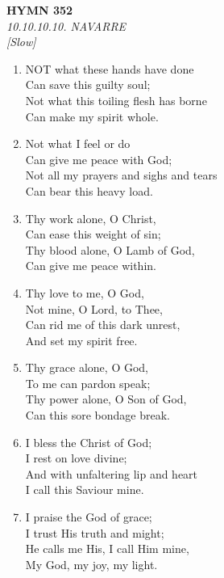 \newpage
\begin{center}
    {\Large \textbf{HYMN 352}}
    \\
    \textit{10.10.10.10. NAVARRE}
    \\
    \textit{\small [Slow]}
\end{center}
\vspace{1em}

\begin{enumerate}
    \item NOT what these hands have done \\
        Can save this guilty soul; \\
        Not what this toiling flesh has borne \\
        Can make my spirit whole.

    \item Not what I feel or do \\
        Can give me peace with God; \\
        Not all my prayers and sighs and tears \\
        Can bear this heavy load.

    \item Thy work alone, O Christ, \\
        Can ease this weight of sin; \\
        Thy blood alone, O Lamb of God, \\
        Can give me peace within.

    \item Thy love to me, O God, \\
        Not mine, O Lord, to Thee, \\
        Can rid me of this dark unrest, \\
        And set my spirit free.

    \item Thy grace alone, O God, \\
        To me can pardon speak; \\
        Thy power alone, O Son of God, \\
        Can this sore bondage break.

    \item I bless the Christ of God; \\
        I rest on love divine; \\
        And with unfaltering lip and heart \\
        I call this Saviour mine.

    \item I praise the God of grace; \\
        I trust His truth and might; \\
        He calls me His, I call Him mine, \\
        My God, my joy, my light.

\end{enumerate}

